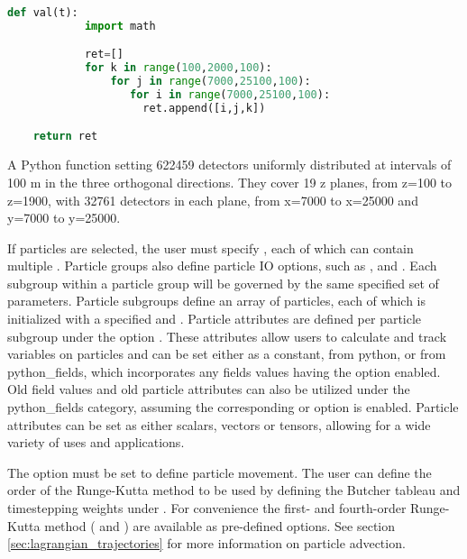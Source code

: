 \begin{example}
  \begin{lstlisting}[language=Python]
def val(t):
            import math

            ret=[]
            for k in range(100,2000,100):
                for j in range(7000,25100,100):
	               for i in range(7000,25100,100):
		             ret.append([i,j,k])

	return ret
  \end{lstlisting}
  \caption{A Python function setting 622459 detectors uniformly distributed
    at intervals of 100 m in the three orthogonal directions. They cover 19 z planes, from z=100 to z=1900, with 32761 detectors in each plane, from
    x=7000 to x=25000 and y=7000 to y=25000.}
  \label{examp:python_function_detectors_1}
\end{example}

If particles are selected, the user must specify , each of which can contain multiple . Particle groups also define particle IO options, such as ,  and . Each subgroup within a particle group will be governed by the same specified set of parameters. Particle subgroups define an array of particles, each of which is initialized with a specified  and . Particle attributes are defined per particle subgroup under the option . These attributes allow users to calculate and track variables on particles and can be set either as a constant, from python, or from python\_fields, which incorporates any fields values having the option  enabled. Old field values and old particle attributes can also be utilized under the python\_fields category, assuming the corresponding  or  option is enabled. Particle attributes can be set as either scalars, vectors or tensors, allowing for a wide variety of uses and applications.

The option  must be set to define particle movement. The user can define the order of the Runge-Kutta method to be used by defining the Butcher tableau and timestepping weights under . For convenience the first- and fourth-order Runge-Kutta method ( and ) are available as pre-defined options. See section \ref{sec:lagrangian_trajectories} for more information on particle advection.

